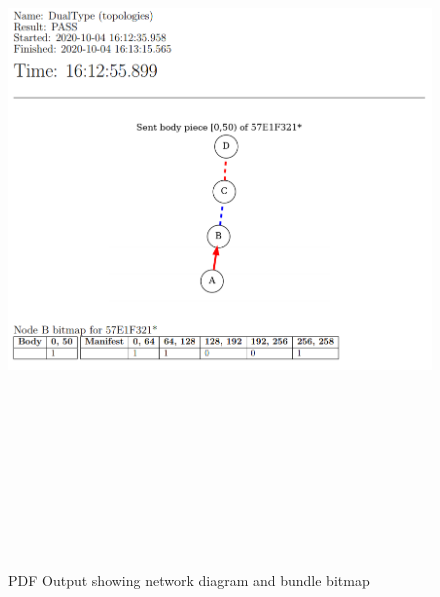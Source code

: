 \begin{figure}
    \begin{centering}
        \includegraphics[width=15cm,height=20cm,keepaspectratio]{Figures/Chapter6-PDFPartition.png}
        \caption{PDF Output showing network diagram and bundle bitmap}
        \label{fig:chapter6PDFPartition}
    \end{centering}
\end{figure}

